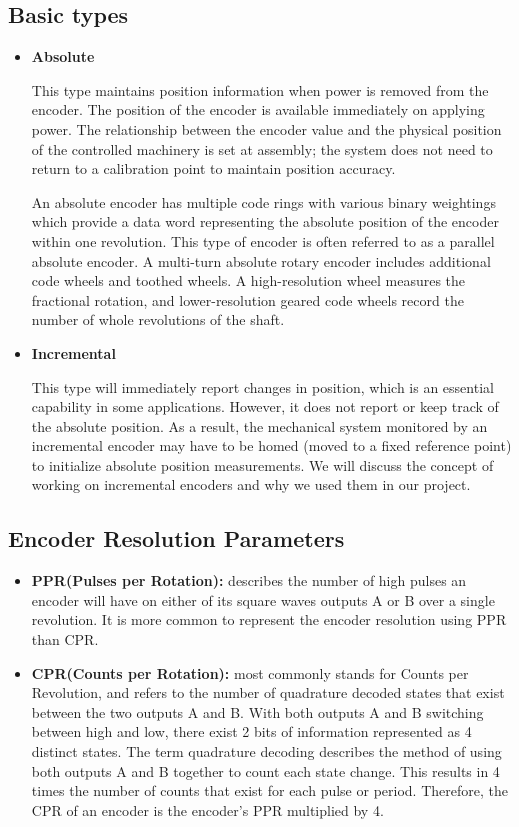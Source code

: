 \subsection{Basic types}
\begin{itemize}
\item \textbf{Absolute}

This type maintains position information when power is removed from the encoder. The position of the encoder is available immediately on applying power. The relationship between the encoder value and the physical position of the controlled machinery is set at assembly; the system does not need to return to a calibration point to maintain position accuracy.

An absolute encoder has multiple code rings with various binary weightings which provide a data word representing the absolute position of the encoder within one revolution. This type of encoder is often referred to as a parallel absolute encoder. A multi-turn absolute rotary encoder includes additional code wheels and toothed wheels. A high-resolution wheel measures the fractional rotation, and lower-resolution geared code wheels record the number of whole revolutions of the shaft.

\item \textbf{Incremental}

This type will immediately report changes in position, which is an essential capability in some applications. However, it does not report or keep track of the absolute position. As a result, the mechanical system monitored by an incremental encoder may have to be homed (moved to a fixed reference point) to initialize absolute position measurements. We will discuss the concept of working on incremental encoders and why we used them in our project.
\end{itemize}

\subsection{Encoder Resolution Parameters}
\begin{itemize}
    \item \textbf{PPR(Pulses per Rotation):}
    describes the number of high pulses an encoder will have on either of its square waves outputs A or B over a single revolution. It is more common to represent the encoder resolution using PPR than CPR.

    \item \textbf{CPR(Counts per Rotation):}
    most commonly stands for Counts per Revolution, and refers to the number of quadrature decoded states that exist between the two outputs A and B. With both outputs A and B switching between high and low, there exist 2 bits of information represented as 4 distinct states. The term quadrature decoding describes the method of using both outputs A and B together to count each state change. This results in 4 times the number of counts that exist for each pulse or period. Therefore, the CPR of an encoder is the encoder’s PPR multiplied by 4.

\end{itemize}

